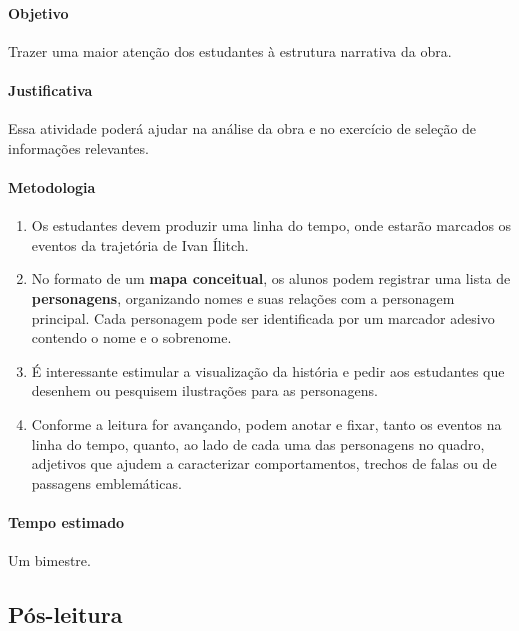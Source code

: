\documentclass[12pt]{extarticle}
\begin{document}
\paragraph{Objetivo} Trazer uma maior atenção dos estudantes à estrutura
narrativa da obra.

\paragraph{Justificativa} Essa atividade poderá ajudar na análise 
da obra e no exercício de seleção de informações relevantes.

\paragraph{Metodologia}

\begin{enumerate}

\item Os estudantes devem produzir uma linha do
tempo, onde estarão marcados os eventos da trajetória de Ivan Ílitch.

\item No formato de um \textbf{mapa conceitual}, os alunos podem 
registrar uma lista de \textbf{personagens}, organizando nomes e suas
relações com a personagem principal. Cada personagem pode ser
identificada por um marcador adesivo contendo o nome e o sobrenome.

\item É interessante estimular a visualização da história e pedir aos estudantes
que desenhem ou pesquisem ilustrações para as personagens.

\item Conforme a leitura for avançando, podem anotar e fixar, tanto os eventos na linha do
tempo, quanto, ao lado de cada uma das personagens no quadro, adjetivos
que ajudem a caracterizar comportamentos, trechos de falas ou de
passagens emblemáticas.

\end{enumerate}

\paragraph{Tempo estimado} Um bimestre.


\subsection{Pós-leitura}
\end{document}
